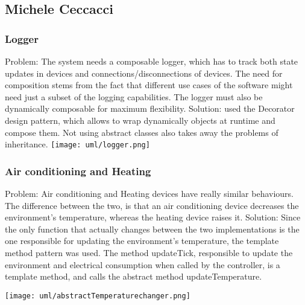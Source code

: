 \subsection{Michele Ceccacci}

\subsubsection{Logger} 
Problem: The system needs a composable logger, which has to track both state updates in devices and connections/disconnections
of devices. The need for composition stems from the fact that different use cases of the software might need just a subset
of the logging capabilities. The logger must also be dynamically composable for maximum flexibility.
Solution: used the Decorator design pattern, which allows to wrap dynamically objects at runtime and compose them.
Not using abstract classes also takes away the problems of inheritance. \newline
\texttt{[image: uml/logger.png]}

\subsubsection{Air conditioning and Heating}
Problem: 
Air conditioning and Heating devices have really similar behaviours. The difference between the two, is that an air conditioning
device decreases the environment's temperature, whereas the heating device raises it.
Solution: Since the only function that actually changes between the two implementations is the one responsible for updating the
environment's temperature, the template method pattern was used. 
The method updateTick, responsible to update the environment and electrical consumption when called by the controller,
is a template method, and calls the abstract method updateTemperature. \newline

\texttt{[image: uml/abstractTemperaturechanger.png]}